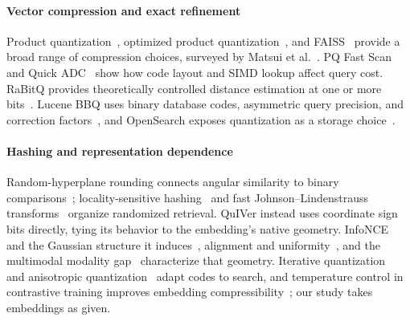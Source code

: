 \paragraph{Vector compression and exact refinement}
Product quantization~\cite{jegou2011pq}, optimized product quantization~\cite{ge2013opq}, and FAISS~\cite{johnson2021faiss} provide a broad range of compression choices, surveyed by Matsui et al.~\cite{matsui2018pqs}. PQ Fast Scan~\cite{andre2015pqfs} and Quick ADC~\cite{andre2017quickadc} show how code layout and SIMD lookup affect query cost. RaBitQ provides theoretically controlled distance estimation at one or more bits~\cite{gao2024rabitq,gao2025extended}. Lucene BBQ uses binary database codes, asymmetric query precision, and correction factors~\cite{trent2024bbq,veasey2024osq}, and OpenSearch exposes quantization as a storage choice~\cite{opensearch2024bq}.

\paragraph{Hashing and representation dependence}
Random-hyperplane rounding connects angular similarity to binary comparisons~\cite{goemans1995improved,charikar2002similarity}; locality-sensitive hashing~\cite{indyk1998lsh,datar2004pstable} and fast Johnson--Lindenstrauss transforms~\cite{ailon2009fastjlt} organize randomized retrieval. QuIVer instead uses coordinate sign bits directly, tying its behavior to the embedding's native geometry. InfoNCE~\cite{oord2018infonce} and the Gaussian structure it induces~\cite{betser2026infonce}, alignment and uniformity~\cite{wang2020understanding}, and the multimodal modality gap~\cite{liang2022modgap} characterize that geometry. Iterative quantization~\cite{gong2011itq} and anisotropic quantization~\cite{guo2020scann} adapt codes to search, and temperature control in contrastive training improves embedding compressibility~\cite{dinu2025temperature}; our study takes embeddings as given.

